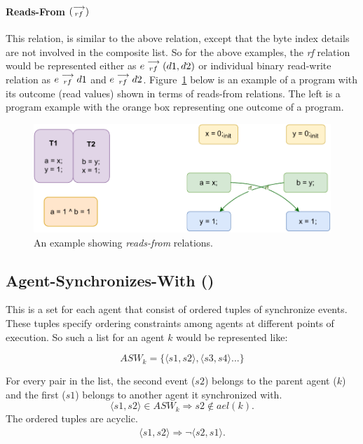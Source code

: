             \paragraph{Reads-From $(\stackrel{\longrightarrow}{_{rf}})$}
            This relation, is similar to the above relation, except that the byte index details are not involved in the composite list. 
            So for the above examples, the \textit{rf} relation would be represented either as   
                $e\stackrel{\longrightarrow}{_{rf}}(d1, d2)$
            or individual binary read-write relation as 
                $e\stackrel{\longrightarrow}{_{rf}}d1$ and $e\stackrel{\longrightarrow}{_{rf}}d2$.
            Figure~\ref{model:read-from} below is an example of a program with its outcome (read values) shown in terms of reads-from relations.
            The left is a program example with the orange box representing one outcome of a program. 
            \begin{figure}[H]
                \centering
                \includegraphics[scale=0.7]{3.ECMAScriptMemoryModel/ReadsFrom.pdf}
                \caption{An example showing \textit{reads-from} relations.}
                \label{model:read-from}
            \end{figure}
            
        \subsection{Agent-Synchronizes-With ()}
            This is a set for each agent that consist of ordered tuples of synchronize events. 
            These tuples specify ordering constraints among agents at different points of execution. 
            So such a list for an agent $k$ would be represented like:  

                \[ASW_k = \{ \langle s1, s2 \rangle, \langle s3, s4 \rangle ...\}\]
        
            For every pair in the list, the second event ($s2$) belongs to the parent agent ($k$) and the first ($s1$) belongs to another agent it synchronized with\footnotemark.
                \[  
                    \langle s1, s2 \rangle \in ASW_k 
                    \Rightarrow{} 
                    s2 \notin ael(k).                        
                \]
            The ordered tuples are acyclic.
            \begin{align*}
                \langle s1, s2 \rangle \Rightarrow \neg \langle s2, s1 \rangle.
            \end{align*}

